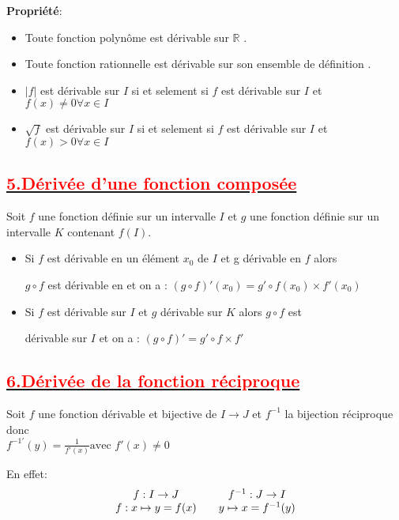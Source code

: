 \documentclass[12pt]{article}
\begin{document}
\textbf{Propriété}:
\begin{itemize}
\item Toute fonction polynôme est dérivable sur \( \mathbb{R} \) .
\item Toute fonction rationnelle est dérivable sur son ensemble de définition .
\item \(|f|\) est dérivable sur \( I \) si et selement si \( f \) est dérivable sur \( I \) et \( f(x)  \neq 0 \forall x \in  I \)
\item \(\sqrt{f}\) est dérivable sur \( I \) si et selement si \( f \) est dérivable sur \( I \) et \( f(x) >0 \forall x \in I \)
\end{itemize}
\subsection*{\underline{\textbf{\textcolor{red}{5.Dérivée d’une fonction composée}}}}

Soit \( f \) une fonction définie sur un intervalle \( I \) et \( g \) une fonction définie sur un intervalle \( K \) contenant \( f(I) \).

\begin{itemize}
\item Si \( f \) est dérivable en un élément \( x_{0} \) de \( I \) et g dérivable en \( f \) alors 

\( g\circ f \) est dérivable en et on a : \( (g\circ f)'(x_{0}) = g' \circ f(x_{0}) \times  f'(x_{0}) \) 

\item Si \( f \) est dérivable sur \( I \) et \( g \) dérivable sur \( K \) alors \( g\circ f \) est

dérivable sur \( I \) et on a : \( (g\circ f)' = g' \circ f \times  f' \)

\end{itemize}

\subsection*{\underline{\textbf{\textcolor{red}{6.Dérivée de la fonction réciproque }}}}

Soit \( f \) une fonction dérivable et bijective de \( I \to J \)  et \( f^{-1} \) la bijection réciproque donc\\ \( f^{-1'}(y)=\frac{1}{f'(x)} \text{avec } f'(x)\neq 0\)

En effet: 
\[
\begin{array}{c c c c}
f : I \to J & & f^{-1} : J \to I \\
f : x \mapsto y = f(x) & & y \mapsto x = f^{-1}(y)
\end{array}
\]
\end{document}
